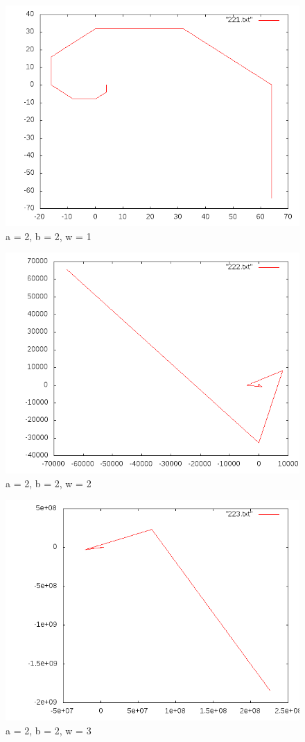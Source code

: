 \documentclass[12pt]{article}
\begin{document}
\begin{figure}[h!]
  \caption{a = 2, b = 2, w = 1}
  \centering
    \includegraphics[scale=0.3]{221.png}
\end{figure}
\begin{figure}[h!]
  \caption{a = 2, b = 2, w = 2}
  \centering
    \includegraphics[scale=0.3]{222.png}
\end{figure}
\begin{figure}[h!]
  \caption{a = 2, b = 2, w = 3}
  \centering
    \includegraphics[scale=0.3]{223.png}
\end{figure}
\end{document}
